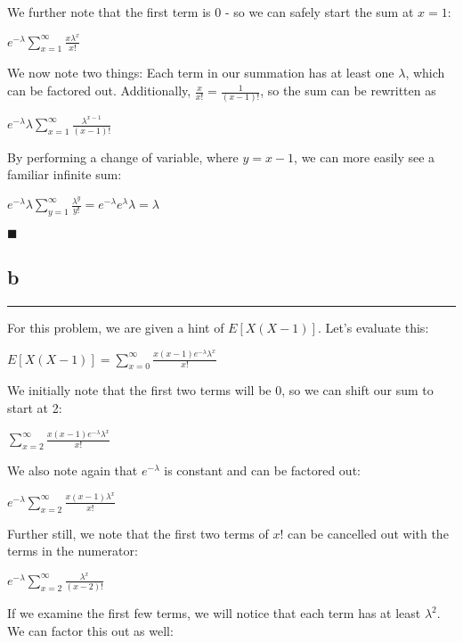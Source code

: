 \documentclass[]{tufte-handout}
\begin{document}
We further note that the first term is 0 - so we can safely start the
sum at \(x = 1\):

\(e^{-\lambda}\sum\limits_{x = 1}^{\infty}\frac{x\lambda^x}{x!}\)

We now note two things: Each term in our summation has at least one
\(\lambda\), which can be factored out. Additionally,
\(\frac{x}{x!} = \frac{1}{(x-1)!}\), so the sum can be rewritten as

\(e^{-\lambda}\lambda\sum\limits_{x = 1}^{\infty}\frac{\lambda^{x-1}}{(x-1)!}\)

By performing a change of variable, where \(y = x - 1\), we can more
easily see a familiar infinite sum:

\(e^{-\lambda}\lambda\sum\limits_{y = 1}^{\infty}\frac{\lambda^{y}}{y!} = e^{-\lambda}e^\lambda\lambda = \lambda\)

\begin{marginfigure}
\(\blacksquare\)
\end{marginfigure}

\hypertarget{b-5}{%
\subsection{b}\label{b-5}}

\begin{center}\rule{0.5\linewidth}{0.5pt}\end{center}

For this problem, we are given a hint of \(E[X(X-1)]\). Let's evaluate
this:

\(E[X(X-1)] = \sum\limits_{x=0}^\infty \frac{x(x-1)e^{-\lambda}\lambda^x}{x!}\)

We initially note that the first two terms will be 0, so we can shift
our sum to start at 2:

\(\sum\limits_{x=2}^\infty \frac{x(x-1)e^{-\lambda}\lambda^x}{x!}\)

We also note again that \(e^{-\lambda}\) is constant and can be factored
out:

\(e^{-\lambda}\sum\limits_{x=2}^\infty \frac{x(x-1)\lambda^x}{x!}\)

Further still, we note that the first two terms of \(x!\) can be
cancelled out with the terms in the numerator:

\(e^{-\lambda}\sum\limits_{x=2}^\infty \frac{\lambda^x}{(x-2)!}\)

If we examine the first few terms, we will notice that each term has at
least \(\lambda^2\). We can factor this out as well:
\end{document}
